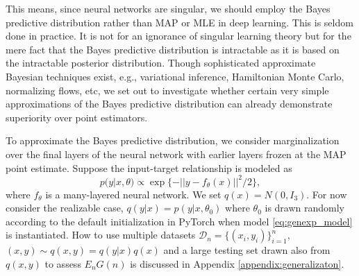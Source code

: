 \documentclass{article} %
\begin{document}
This means, since neural networks are singular, we should employ the Bayes predictive distribution rather than MAP or MLE in deep learning. This is seldom done in practice. It is not for an ignorance of singular learning theory but for the mere fact that the Bayes predictive distribution is intractable as it is based on the intractable posterior distribution. 
Though sophisticated approximate Bayesian techniques exist, e.g., variational inference, Hamiltonian Monte Carlo, normalizing flows, etc, we set out to investigate whether certain very simple approximations of the Bayes predictive distribution can already demonstrate superiority over point estimators. 

To approximate the Bayes predictive distribution, we consider marginalization over the final layers of the neural network with earlier layers frozen at the MAP point estimate. Suppose the input-target relationship is modeled as
\begin{equation}
p(y|x,\theta) \propto \exp\{-|| y - f_\theta(x) ||^2/2\},
\label{eq:genexp_model}
\end{equation}
where $f_\theta$ is a many-layered neural network.
We set $q(x) = N(0,I_3)$. 
For now consider the realizable case, $q(y|x) = p(y|x,\theta_0)$ where $\theta_0$ is drawn randomly according to the default initialization in PyTorch when model \ref{eq:genexp_model} is instantiated. How to use multiple datasets $\mathcal D_n = \{(x_i,y_i)\}_{i=1}^n$, $(x,y) \sim q(x,y) = q(y|x)q(x)$ and a large testing set drawn also from $q(x,y)$ to assess $E_n G(n)$ is discussed in Appendix \ref{appendix:generalizaton}. 
\end{document}

